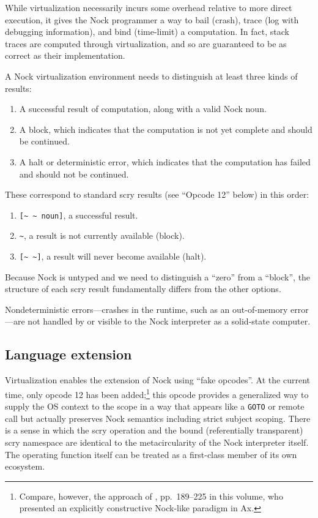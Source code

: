 \documentclass[twoside]{article}
\begin{document}
While virtualization necessarily incurs some overhead relative to more direct execution, it gives the Nock programmer a way to bail (crash), trace (log with debugging information), and bind (time-limit) a computation.  In fact, stack traces are computed through virtualization, and so are guaranteed to be as correct as their implementation.

A Nock virtualization environment needs to distinguish at least three kinds of results:

\begin{enumerate}
  \item  A successful result of computation, along with a valid Nock noun.
  \item  A block, which indicates that the computation is not yet complete and should be continued.
  \item  A halt or deterministic error, which indicates that the computation has failed and should not be continued.
\end{enumerate}

\noindent
These correspond to standard scry results (see ``Opcode 12'' below) in this order:

\begin{enumerate}
  \item  \lstinline[style=inlinecode]{[~ ~ noun]}, a successful result.
  \item  \lstinline[style=inlinecode]{~}, a result is not currently available (block).
  \item  \lstinline[style=inlinecode]{[~ ~]}, a result will never become available (halt).
\end{enumerate}

\noindent
Because Nock is untyped and we need to distinguish a ``zero'' from a ``block'', the structure of each scry result fundamentally differs from the other options.

Nondeterministic errors—crashes in the runtime, such as an out-of-memory error—are not handled by or visible to the Nock interpreter as a solid-state computer.



\subsection{Language extension}

Virtualization enables the extension of Nock using ``fake opcodes''.  At the current time, only opcode 12 has been added;\footnote{Compare, however, the approach of , pp.~189–225 in this volume, who presented an explicitly constructive Nock-like paradigm in Ax.} this opcode provides a generalized way to supply the OS context to the scope in a way that appears like a \texttt{GOTO} or remote call but actually preserves Nock semantics including strict subject scoping.  There is a sense in which the scry operation and the bound (referentially transparent) scry namespace are identical to the metacircularity of the Nock interpreter itself.  The operating function itself can be treated as a first-class member of its own ecosystem.
\end{document}
